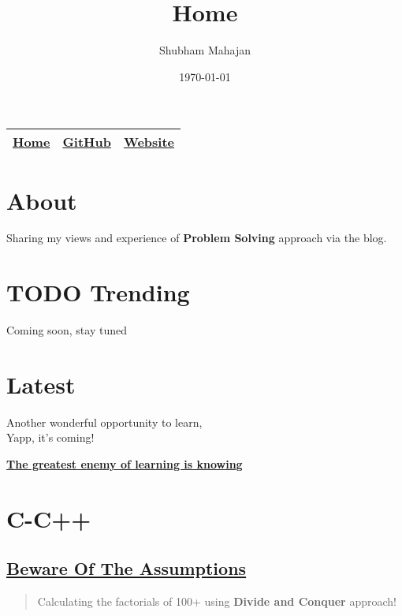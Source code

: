 \documentclass[11pt]{article}
\author{Shubham Mahajan}
\date{\today}
\title{Home}
\begin{document}
\maketitle
\tableofcontents

\begin{center}
\begin{tabular}{ccc}
\hline
\hline
\href{https://imahajanshubham.github.io/docs/home.html}{Home} & \href{https://github.com/imahajanshubham}{GitHub} & \href{https://sites.google.com/view/the-launchpad/home}{Website}\\
\hline
\end{tabular}
\end{center}

\section{About}
\label{sec:org066cdcd}
Sharing my views and experience of \textbf{Problem Solving} approach via the blog.

\section{{\bfseries\sffamily TODO} Trending}
\label{sec:org5abbe2a}
Coming soon, stay tuned

\section{Latest}
\label{sec:orgeb0483a}
\begin{attention}
Another wonderful opportunity to learn,\\
Yapp, it’s coming!

\textbf{\href{https://imahajanshubham.github.io/docs/others/words\_to\_cherish.html}{The greatest enemy of learning is knowing}}
\end{attention}

\section{C-C++}
\label{sec:orgafd0cb9}
\subsection{\href{https://imahajanshubham.github.io/docs/lang/c-c++/beware\_of\_the\_assumptions.html}{Beware Of The Assumptions}}
\label{sec:org4244125}
\begin{quote}
Calculating the factorials of 100+ using \textbf{Divide and Conquer} approach!
\end{quote}
\end{document}
